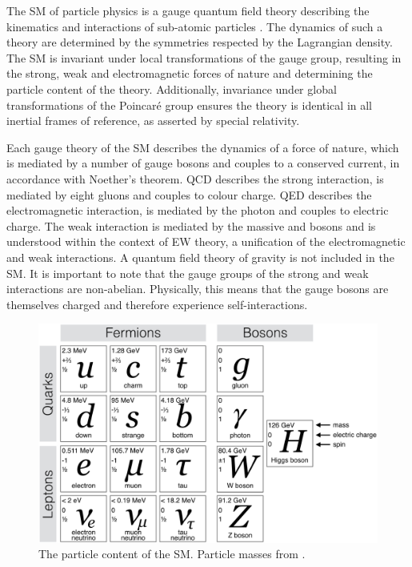 
The \ac{SM} of particle physics is a gauge quantum field theory describing the kinematics and interactions of sub-atomic particles \cite{Aitchison,Peskin}. The dynamics of such a 
theory are determined by the symmetries respected by the Lagrangian density.
The \ac{SM} is invariant under local transformations of the \SMgroup gauge group,
resulting in the strong, weak and electromagnetic forces of nature and determining
the particle content of the theory. Additionally, invariance under global 
transformations of the Poincaré group ensures the theory is identical in all 
inertial frames of reference, as asserted by special relativity.

Each gauge theory of the \ac{SM} describes the dynamics of a force of nature, which 
is mediated by a number of gauge bosons and couples to a conserved current, in 
accordance with Noether's theorem. \ac{QCD} describes the strong 
interaction, is mediated by eight gluons and couples to colour charge. \ac{QED}
describes the electromagnetic interaction, is mediated by the 
photon and couples to electric charge. The weak interaction is mediated by the massive 
\PWpm and \PZ bosons and is understood within the context of \ac{EW} theory,
a unification of the electromagnetic and weak interactions. A quantum field theory of
gravity is not included in the \ac{SM}. It is important to note that the gauge groups of 
the strong and weak interactions are non-abelian. Physically, this means that the
gauge bosons are themselves charged and therefore experience self-interactions.

\begin{figure}
	\includegraphics[width=\largefigwidth]{tex/motivation/sm_particles}
	\caption{The particle content of the \ac{SM}. Particle masses from \cite{PDG}.
	}
	\label{fig:sm_particles}
\end{figure}

